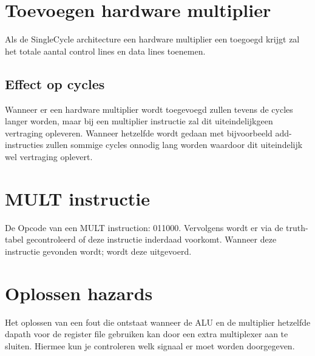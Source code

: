 \documentclass[a4paper,12pt]{article}
\begin{document}
\section{Toevoegen hardware multiplier}
Als de SingleCycle architecture een hardware multiplier een toegoegd krijgt zal het totale aantal control lines en data lines toenemen.

\subsection{Effect op cycles}
Wanneer er een hardware multiplier wordt toegevoegd zullen tevens de cycles  langer worden, maar bij een multiplier instructie zal dit uiteindelijkgeen vertraging opleveren. 
Wanneer hetzelfde wordt gedaan met bijvoorbeeld add-instructies zullen sommige cycles onnodig lang worden waardoor dit uiteindelijk wel vertraging oplevert. 

\section{MULT instructie}
De Opcode van een MULT instruction: 011000. Vervolgens wordt er via de truth-tabel gecontroleerd of deze instructie 
inderdaad voorkomt. Wanneer deze instructie gevonden wordt; wordt deze uitgevoerd. 

\section{Oplossen hazards}
Het oplossen van een fout die ontstaat wanneer de ALU en de multiplier hetzelfde dapath voor de register file gebruiken kan door een extra multiplexer aan te sluiten. Hiermee kun je controleren welk 
signaal er moet worden doorgegeven. 

\end{document}
